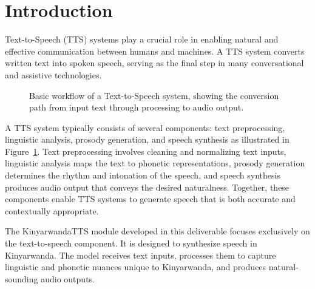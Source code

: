 \documentclass{CSSRforAfrica}
\begin{document}
\newpage
 
 
\pagebreak
\tableofcontents
\newpage


\section{Introduction}
Text-to-Speech (TTS) systems play a crucial role in enabling natural and effective communication between humans and machines. A TTS system converts written text into spoken speech, serving as the final step in many conversational and assistive technologies. \\

\begin{figure}[h]
    \centering
    \caption{Basic workflow of a Text-to-Speech system, showing the conversion path from input text through processing to audio output.}
    \label{fig:tts-workflow}
\end{figure}

A TTS system typically consists of several components: text preprocessing, linguistic analysis, prosody generation, and speech synthesis as illustrated in Figure~\ref{fig:tts-workflow}. Text preprocessing involves cleaning and normalizing text inputs, linguistic analysis maps the text to phonetic representations, prosody generation determines the rhythm and intonation of the speech, and speech synthesis produces audio output that conveys the desired naturalness. Together, these components enable TTS systems to generate speech that is both accurate and contextually appropriate.

The KinyarwandaTTS module developed in this deliverable focuses exclusively on the text-to-speech component. It is designed to synthesize speech in Kinyarwanda. The model receives text inputs, processes them to capture linguistic and phonetic nuances unique to Kinyarwanda, and produces natural-sounding audio outputs.
\end{document}
